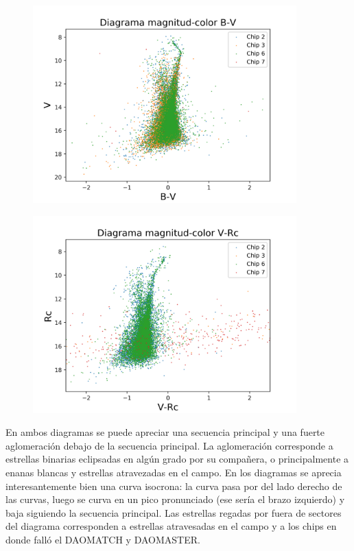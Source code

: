 \documentclass[12pt]{article}
\begin{document}
\begin{figure}[H]
  \centering
   \includegraphics[width = 4in]{diagramaMagnitudColor.png}
\end{figure}
\begin{figure}[H]
  \centering
   \includegraphics[width = 4in]{diagramaMagnitudColor2.png}
\end{figure}
   

En ambos diagramas se puede apreciar una secuencia principal y una fuerte aglomeración debajo de la secuencia principal. La aglomeración corresponde a estrellas binarias eclipsadas en algún grado por su compañera, o principalmente a enanas blancas y estrellas atravezadas en el campo. En los diagramas se aprecia interesantemente bien una curva isocrona: la curva pasa por  del lado derecho de las curvas, luego se curva en un pico pronunciado (ese sería el brazo izquierdo) y baja siguiendo la secuencia principal. Las estrellas regadas por fuera de sectores del diagrama corresponden a estrellas atravesadas en el campo y a los chips en donde falló el DAOMATCH y DAOMASTER.








%

\end{document}
